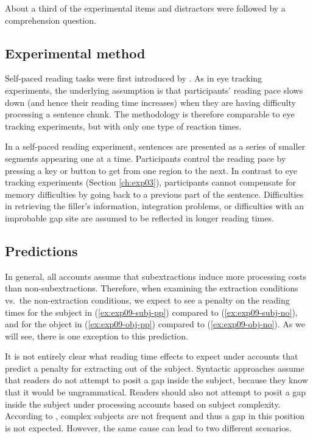 About a third of the experimental items and distractors were followed by a comprehension question.

\subsection{Experimental method}

Self-paced reading tasks were first introduced by \citet{Just.1982}. 
As in eye tracking experiments, the underlying assumption is that participants' reading pace slows down (and hence their reading time increases) when they are having difficulty processing a sentence chunk. The methodology is therefore comparable to eye tracking experiments, but with only one type of reaction times.

In a self-paced reading experiment, sentences are presented as a series of smaller segments appearing one at a time. Participants control the reading pace by pressing a key or button to get from one region to the next. 
In contrast to eye tracking experiments (Section \ref{ch:exp03}), participants cannot compensate for memory difficulties by going back to a previous part of the sentence. Difficulties in retrieving the filler's information, integration problems, or difficulties with an improbable gap site are assumed to be reflected in longer reading times.

\subsection{Predictions} 

In general, all accounts assume that subextractions induce more processing costs than non-subextractions. Therefore, when examining the extraction conditions vs.\ the non-extraction conditions, we expect to see a penalty on the reading times for the subject in (\ref{ex:exp09-subj-pp}) compared to (\ref{ex:exp09-subj-no}), and for the object in (\ref{ex:exp09-obj-pp}) compared to (\ref{ex:exp09-obj-no}). As we will see, there is one exception to this prediction.

It is not entirely clear what reading time effects to expect under accounts that predict a penalty for extracting out of the subject. Syntactic approaches assume that readers do not attempt to posit a gap inside the subject, because they know that it would be ungrammatical. Readers should also not attempt to posit a gap inside the subject under processing accounts based on subject complexity. According to \citet{Kluender.2004}, complex subjects are not frequent and thus a gap in this position is not expected. However, the same cause can lead to two different scenarios.

